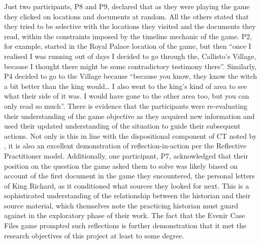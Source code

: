 \documentclass{l4proj}
\begin{document}
Just two participants, P8 and P9, declared that as they were playing the game they clicked on locations and documents at random. All the others stated that they tried to be selective with the locations they visited and the documents they read, within the constraints imposed by the timeline mechanic of the game. P2, for example, started in the Royal Palace location of the game, but then “once I realised I was running out of days I decided to go through the, Callisto’s Village, because I thought there might be some contradictory testimony there”. Similarly, P4 decided to go to the Village because “because you know, they know the witch a bit better than the king would… I also went to the king’s kind of area to see what their side of it was. I would have gone to the other area too, but you can only read so much”. There is evidence that the participants were re-evaluating their understanding of the game objective as they acquired new information and used their updated understanding of the situation to guide their subsequent actions. Not only is this in line with the dispositional component of CT noted by \citet{facione2000CT}, it is also an excellent demonstration of reflection-in-action per the Reflective Practitioner model. Additionally, one participant, P7, acknowledged that their position on the question the game asked them to solve was likely biased on account of the first document in the game they encountered, the personal letters of King Richard, as it conditioned what sources they looked for next. This is a sophisticated understanding of the relationship between the historian and their source material, which \citet{tosh2006pursuit} themselves note the practicing historian must guard against in the exploratory phase of their work. The fact that the Evenir Case Files game prompted such reflections is further demonstration that it met the research objectives of this project at least to some degree. 
\end{document}
